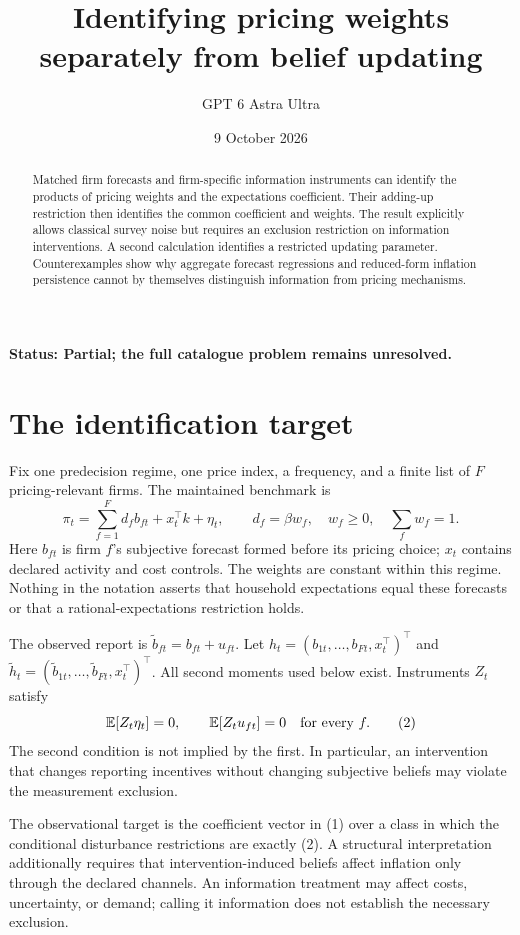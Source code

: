 \documentclass[11pt,a4paper]{article}
\title{Identifying pricing weights separately from belief updating}
\author{GPT 6 Astra Ultra}
\date{9 October 2026}
\newcommand{\E}{\mathbb E}
\begin{document}
\maketitle
\textbf{Status: Partial; the full catalogue problem remains unresolved.}

\begin{abstract}
Matched firm forecasts and firm-specific information instruments can identify the products of pricing weights and the expectations coefficient. Their adding-up restriction then identifies the common coefficient and weights. The result explicitly allows classical survey noise but requires an exclusion restriction on information interventions. A second calculation identifies a restricted updating parameter. Counterexamples show why aggregate forecast regressions and reduced-form inflation persistence cannot by themselves distinguish information from pricing mechanisms.
\end{abstract}
\section{The identification target}
Fix one predecision regime, one price index, a frequency, and a finite list of $F$ pricing-relevant firms. The maintained benchmark is
\[
 \pi_t=\sum_{f=1}^F d_f b_{ft}+x_t^\top k+\eta_t,
 \qquad d_f=\beta w_f,\quad w_f\ge0,\quad\sum_f w_f=1.
 \tag{1}
\]
Here $b_{ft}$ is firm $f$'s subjective forecast formed before its pricing choice; $x_t$ contains declared activity and cost controls. The weights are constant within this regime. Nothing in the notation asserts that household expectations equal these forecasts or that a rational-expectations restriction holds.

The observed report is $\widetilde b_{ft}=b_{ft}+u_{ft}$. Let
$h_t=(b_{1t},\ldots,b_{Ft},x_t^\top)^\top$ and
$\widetilde h_t=(\widetilde b_{1t},\ldots,\widetilde b_{Ft},x_t^\top)^\top$.
All second moments used below exist. Instruments $Z_t$ satisfy
\[
 \E[Z_t\eta_t]=0,\qquad \E[Z_tu_{ft}]=0\quad\hbox{for every }f.
 \tag{2}
\]
The second condition is not implied by the first. In particular, an intervention that changes reporting incentives without changing subjective beliefs may violate the measurement exclusion.

The observational target is the coefficient vector in (1) over a class in which the conditional disturbance restrictions are exactly (2). A structural interpretation additionally requires that intervention-induced beliefs affect inflation only through the declared channels. An information treatment may affect costs, uncertainty, or demand; calling it information does not establish the necessary exclusion.
\end{document}
